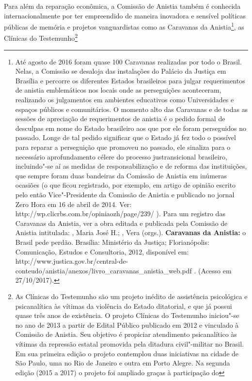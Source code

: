 Para além da reparação econômica, a Comissão de Anistia também é
conhecida internacionalmente por ter empreendido de maneira inovadora e
sensível políticas públicas de memória e projetos vanguardistas como as
Caravanas da Anistia\footnote{Até agosto de 2016 foram quase 100
  Caravanas realizadas por todo o Brasil. Nelas, a Comissão se desaloja
  das instalações do Palácio da Justiça em Brasília e percorre os
  diferentes Estados brasileiros para julgar requerimentos de anistia
  emblemáticos nos locais onde as perseguições aconteceram, realizando
  os julgamentos em ambientes educativos como Universidades e espaços
  públicos e comunitários. O momento alto das Caravanas e de todas as
  sessões de apreciação de requerimentos de anistia é o pedido formal de
  desculpas em nome do Estado brasileiro aos que por ele foram
  perseguidos no passado. Longe de tal pedido significar que o Estado já
  fez todo o possível para reparar a perseguição que promoveu no
  passado, ele sinaliza para o necessário aprofundamento célere do
  processo justransicional brasileiro, incluindo"-se aí as medidas de
  responsabilização e de reforma das instituições, que sempre foram duas
  bandeiras da Comissão de Anistia em inúmeras ocasiões (o que ficou
  registrado, por exemplo, em artigo de opinião escrito pelo então
  Vice"-Presidente da Comissão de Anistia e publicado no jornal Zero Hora
  em 16 de abril de 2014. Ver:
  http://wp.clicrbs.com.br/opiniaozh/page/239/ ). Para um registro das
  Caravanas da Anistia, ver a obra editada e publicada pela Comissão de
  Anistia intitulada: , Maria José H.; , Vera (orgs.).
  \textbf{Caravanas da Anistia:} o Brasil pede perdão. Brasília:
  Ministério da Justiça; Florianópolis: Comunicação, Estudos e
  Consultoria, 2012, disponível em:
  http://www.justica.gov.br/central-de-conteudo/anistia/anexos/livro\_caravanas\_anistia\_web.pdf
  . (Acesso em 27/10/2017).}, as Clínicas do Testemunho\footnote{As
  Clínicas do Testemunho são um projeto inédito de assistência
  psicológica e psicanalítica às vítimas da violência do Estado
  ditatorial, e que já possui quase três anos de existência. O projeto
  Clínicas do Testemunho iniciou"-se no ano de 2013 a partir de Edital
  Público publicado em 2012 e vinculado à Comissão de Anistia. Seu
  objetivo é propiciar atendimento psicanalítico às vítimas da repressão
  estatal promovida pela ditadura civil"-militar no Brasil. Em sua
  primeira edição o projeto contemplou duas iniciativas na cidade de São
  Paulo, uma no Rio de Janeiro e outra em Porto Alegre. Na segunda
  edição (2015 a 2017) o projeto foi ampliado graças à participação do
}
